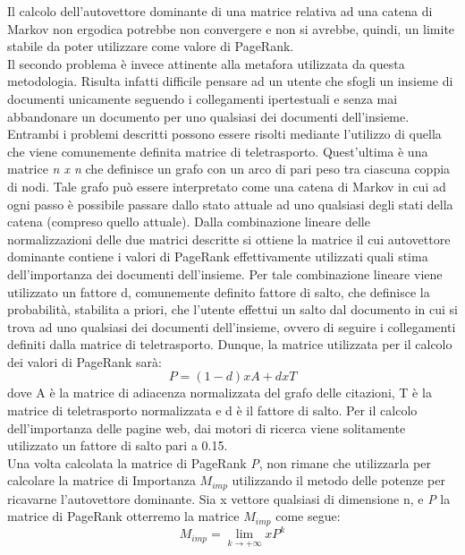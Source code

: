 Il calcolo dell'autovettore dominante di una matrice relativa ad una catena di
Markov non ergodica potrebbe non convergere e non si avrebbe, quindi, un
limite stabile da poter utilizzare come valore di PageRank.\\
Il secondo problema \`e invece attinente alla metafora utilizzata da questa
metodologia. Risulta infatti difficile pensare ad un utente che sfogli un insieme
di documenti unicamente seguendo i collegamenti ipertestuali e senza
mai abbandonare un documento per uno qualsiasi dei documenti dell'insieme.
Entrambi i problemi descritti possono essere risolti mediante l'utilizzo di
quella che viene comunemente definita matrice di teletrasporto. Quest'ultima
\`e una matrice \textit{n x n} che definisce un grafo con un arco di pari peso tra ciascuna
coppia di nodi. Tale grafo pu\`o essere interpretato come una catena di Markov
in cui ad ogni passo \`e possibile passare dallo stato attuale ad uno qualsiasi
degli stati della catena (compreso quello attuale). Dalla combinazione lineare
delle normalizzazioni delle due matrici descritte si ottiene la matrice il cui
autovettore dominante contiene i valori di PageRank effettivamente utilizzati
quali stima dell'importanza dei documenti dell'insieme. Per tale combinazione
lineare viene utilizzato un fattore d, comunemente definito fattore di salto,
che definisce la probabilit\`a, stabilita a priori, che l'utente effettui un salto dal
documento in cui si trova ad uno qualsiasi dei documenti dell'insieme, ovvero
di seguire i collegamenti definiti dalla matrice di teletrasporto. Dunque, la
matrice utilizzata per il calcolo dei valori di PageRank sar\`a:
\begin{equation}
P = (1 - d) x A + d x T
\end{equation}
dove A \`e la matrice di adiacenza normalizzata del grafo delle citazioni, T \`e
la matrice di teletrasporto normalizzata e d \`e il fattore di salto. Per il calcolo
dell'importanza delle pagine web, dai motori di ricerca viene solitamente
utilizzato un fattore di salto pari a 0.15.\\
Una volta calcolata la matrice di PageRank \textit{P}, non rimane che utilizzarla
per calcolare la matrice di Importanza $M_{imp}$ utilizzando il metodo delle potenze
per ricavarne l'autovettore dominante. Sia x vettore qualsiasi di dimensione n,
e \textit{P} la matrice di PageRank otterremo la matrice $M_{imp}$ come segue:
\begin{equation}
M_{imp} = \lim_{k \rightarrow +\infty} x P^{k}
\end{equation}
